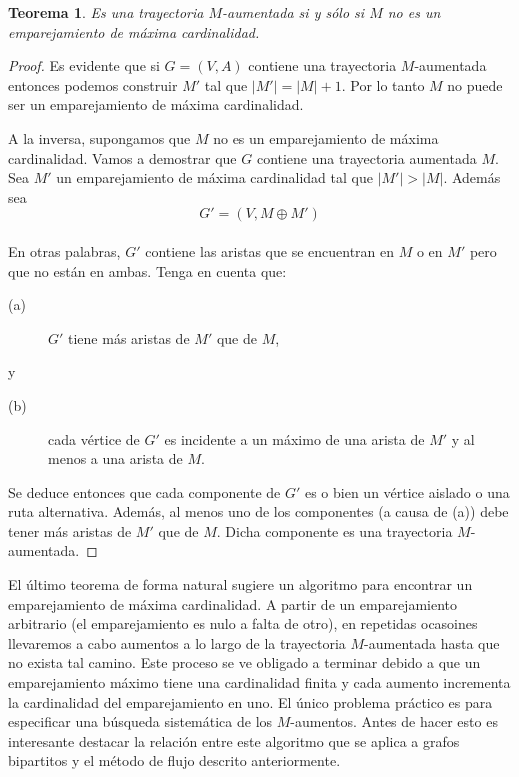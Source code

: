 \documentclass[10pt,a5paper]{book}
\newtheorem{teorema}{Teorema}[chapter]
\begin{document}
\begin{teorema}
Es una trayectoria $M$-aumentada si y sólo si $M$ no es un emparejamiento de máxima cardinalidad.
\end{teorema}
\begin{proof}
Es evidente que si $G = (V,A)$ contiene una trayectoria $M$-aumentada entonces podemos construir $M'$ tal que $|M'| = |M| + 1$. Por lo tanto $M$ no puede ser un emparejamiento de máxima cardinalidad.

A la inversa, supongamos que $M$ no es un emparejamiento de máxima cardinalidad. Vamos a demostrar que $G$ contiene una trayectoria aumentada $M$. Sea $M'$ un emparejamiento de máxima cardinalidad tal que $|M'| > |M|$. Además sea
$$G' = (V,M \oplus M')$$\\
En otras palabras, $G'$ contiene las aristas que se encuentran en $M$ o en $M'$ pero que no están en ambas. Tenga en cuenta que:
\begin{description}
\item[(a)] $G'$ tiene más aristas de $M'$ que de $M$,
\end{description}
y
\begin{description}
\item[(b)] cada vértice de $G'$ es incidente a un máximo de una arista de $M'$ y al menos a una arista de $M$.
\end{description}

Se deduce entonces que cada componente de $G'$ es o bien un vértice aislado o una ruta alternativa. Además, al menos uno de los componentes (a causa de (a)) debe tener más aristas de $M'$ que de $M$. Dicha componente es una trayectoria $M$-aumentada.
\end{proof}

El último teorema de forma natural sugiere un algoritmo para encontrar un emparejamiento de máxima cardinalidad. A partir de un emparejamiento arbitrario (el emparejamiento es nulo a falta de otro), en repetidas ocasoines llevaremos a cabo aumentos a lo largo de la trayectoria $M$-aumentada hasta que no exista tal camino. Este proceso se ve obligado a terminar debido a que un emparejamiento máximo tiene una cardinalidad finita y cada aumento incrementa la cardinalidad del emparejamiento en uno. El único problema práctico es para especificar una búsqueda sistemática de los $M$-aumentos. Antes de hacer esto es interesante destacar la relación entre este algoritmo que se aplica a grafos bipartitos y el método de flujo descrito anteriormente.
\end{document}
